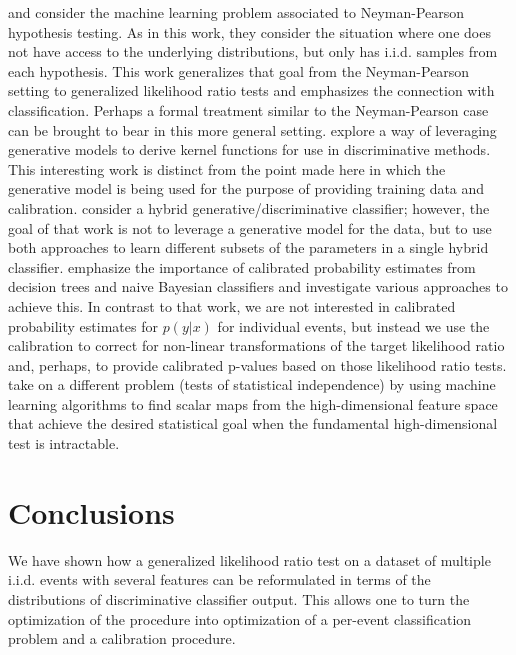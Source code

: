 \documentclass[11pt, oneside]{article}   	%
\begin{document}
\cite{ClaytonScott} and \cite{JMLR:v14:tong13a} consider the machine learning problem associated to Neyman-Pearson hypothesis testing. As in this work, they consider the situation where one does not have access to the underlying distributions, but only has i.i.d. samples from each hypothesis. This work generalizes that goal from the Neyman-Pearson setting to generalized likelihood ratio tests and emphasizes the connection with classification. Perhaps a  formal treatment similar to the Neyman-Pearson case can be brought to bear in this more general setting.
\cite{TommiJaakkola} explore a way of leveraging generative models to derive kernel functions for use in discriminative methods. This interesting work is distinct from the point made here in which the generative model is being used for the purpose of providing training data and calibration.  \cite{McCallum}
 consider a hybrid generative/discriminative classifier; however, the goal of that work is not to leverage a generative model for the data, but to use both approaches to learn different subsets of the parameters in a single hybrid classifier.  \cite{BiancaZadrozny} emphasize the importance of calibrated probability estimates from decision trees and naive Bayesian classifiers and investigate various approaches to achieve this. In contrast to that work, we are not interested in calibrated probability estimates for $p(y|x)$ for individual events, but instead we use the calibration to correct for non-linear transformations of the target likelihood ratio and, perhaps, to provide calibrated p-values based on those likelihood ratio tests. \cite{Ihler2004} take on a different problem (tests of statistical independence) by using machine learning algorithms to find  scalar maps from the high-dimensional feature space that achieve the desired statistical goal when the fundamental high-dimensional test is intractable.


\section{Conclusions}

We have shown how a generalized likelihood ratio test on a dataset of multiple i.i.d. events with several features can be reformulated in terms of the distributions of discriminative classifier output. This allows one to turn the optimization of the procedure into optimization of a per-event classification problem and a calibration procedure.

\end{document}
